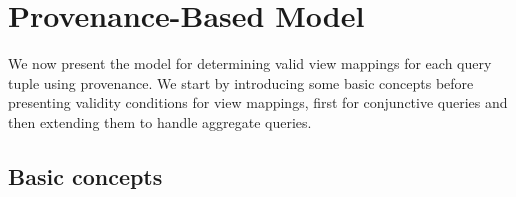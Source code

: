 \section{Provenance-Based Model}\label{sec: model}
We now present the model for determining valid view mappings for each query tuple using provenance.
We start by introducing some basic concepts
before presenting validity conditions for view mappings, first for conjunctive queries and then extending them to handle aggregate queries.


\subsection{Basic concepts}\label{Sec: prelim}
